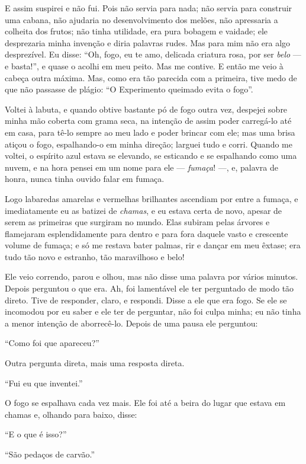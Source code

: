 E assim suspirei e não fui. Pois não servia para nada; não servia para construir
uma cabana, não ajudaria no desenvolvimento dos melões, não apressaria a
colheita dos frutos; não tinha utilidade, era pura bobagem e vaidade; ele
desprezaria minha invenção e diria palavras rudes. Mas para mim não era algo
desprezível. Eu disse: “Oh, fogo, eu te amo, delicada criatura rosa, por
ser \textit{belo} --- e basta!”, e quase o acolhi em meu peito. Mas me contive. E então
me veio à cabeça outra máxima. Mas, como era tão parecida com a
primeira, tive medo de que não passasse de plágio: “O Experimento queimado evita o
fogo”.

Voltei à labuta, e quando obtive bastante pó de fogo outra
vez, despejei sobre minha mão coberta com grama seca, na intenção de assim
poder carregá-lo até em casa, para tê-lo sempre ao meu lado e poder brincar com ele; 
mas uma brisa atiçou o fogo, espalhando-o em minha direção; larguei tudo e corri.
Quando me voltei, o espírito azul estava se elevando, se esticando e se
espalhando como uma nuvem, e na hora pensei em um nome para ele ---
\textit{fumaça}! ---, e, palavra de honra, nunca tinha ouvido falar em fumaça.

Logo labaredas amarelas e vermelhas brilhantes ascendiam por entre a fumaça, e
imediatamente eu as batizei de \textit{chamas}, e eu estava certa de novo, apesar
de serem as primeiras que surgiram no mundo. Elas subiram pelas árvores e
flamejaram esplendidamente para dentro e para fora daquele vasto e crescente 
volume de fumaça; e só me restava bater palmas, rir e dançar em meu êxtase; era tudo
tão novo e estranho, tão maravilhoso e belo!

Ele veio correndo, parou e olhou, mas não disse uma palavra por vários minutos. Depois
perguntou o que era. Ah, foi lamentável ele ter perguntado de modo
tão direto. Tive de responder, claro, e respondi. Disse a ele que
era fogo. Se ele se incomodou por eu saber e ele ter de perguntar, não foi
culpa minha; eu não tinha a menor intenção de aborrecê-lo. Depois de uma pausa
ele perguntou:

“Como foi que apareceu?”

Outra pergunta direta, mais uma resposta direta.

“Fui eu que inventei.”

O fogo se espalhava cada vez mais. Ele foi até a beira do lugar
que estava em chamas e, olhando para baixo, disse:

“E o que é isso?”

“São pedaços de carvão.”


